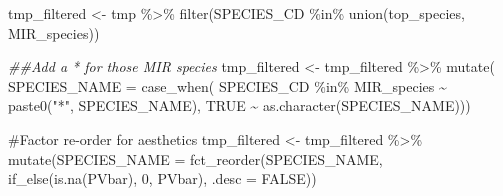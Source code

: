 \documentclass[
]{article}
\newenvironment{Shaded}{\begin{snugshade}}{\end{snugshade}}
\newcommand{\AttributeTok}[1]{\textcolor[rgb]{0.40,0.45,0.13}{#1}}
\newcommand{\CommentTok}[1]{\textcolor[rgb]{0.37,0.37,0.37}{#1}}
\newcommand{\ConstantTok}[1]{\textcolor[rgb]{0.56,0.35,0.01}{#1}}
\newcommand{\DecValTok}[1]{\textcolor[rgb]{0.68,0.00,0.00}{#1}}
\newcommand{\DocumentationTok}[1]{\textcolor[rgb]{0.37,0.37,0.37}{\textit{#1}}}
\newcommand{\FunctionTok}[1]{\textcolor[rgb]{0.28,0.35,0.67}{#1}}
\newcommand{\NormalTok}[1]{\textcolor[rgb]{0.00,0.23,0.31}{#1}}
\newcommand{\OtherTok}[1]{\textcolor[rgb]{0.00,0.23,0.31}{#1}}
\newcommand{\SpecialCharTok}[1]{\textcolor[rgb]{0.37,0.37,0.37}{#1}}
\newcommand{\StringTok}[1]{\textcolor[rgb]{0.13,0.47,0.30}{#1}}
\begin{document}
\begin{Shaded}
\begin{Highlighting}[]
\NormalTok{tmp\_filtered }\OtherTok{\textless{}{-}}\NormalTok{ tmp }\SpecialCharTok{\%\textgreater{}\%}
  \FunctionTok{filter}\NormalTok{(SPECIES\_CD }\SpecialCharTok{\%in\%} \FunctionTok{union}\NormalTok{(top\_species, MIR\_species)) }
  
\DocumentationTok{\#\#Add a * for those MIR species}
\NormalTok{tmp\_filtered }\OtherTok{\textless{}{-}}\NormalTok{ tmp\_filtered }\SpecialCharTok{\%\textgreater{}\%} \FunctionTok{mutate}\NormalTok{(}
  \AttributeTok{SPECIES\_NAME =} \FunctionTok{case\_when}\NormalTok{(}
\NormalTok{    SPECIES\_CD }\SpecialCharTok{\%in\%}\NormalTok{ MIR\_species }\SpecialCharTok{\textasciitilde{}} \FunctionTok{paste0}\NormalTok{(}\StringTok{"*"}\NormalTok{, SPECIES\_NAME),}
    \ConstantTok{TRUE} \SpecialCharTok{\textasciitilde{}} \FunctionTok{as.character}\NormalTok{(SPECIES\_NAME)))}

\CommentTok{\#Factor re{-}order for aesthetics  }
\NormalTok{tmp\_filtered }\OtherTok{\textless{}{-}}\NormalTok{ tmp\_filtered }\SpecialCharTok{\%\textgreater{}\%}
  \FunctionTok{mutate}\NormalTok{(}\AttributeTok{SPECIES\_NAME =} 
           \FunctionTok{fct\_reorder}\NormalTok{(SPECIES\_NAME, }\FunctionTok{if\_else}\NormalTok{(}\FunctionTok{is.na}\NormalTok{(PVbar), }\DecValTok{0}\NormalTok{, PVbar), }\AttributeTok{.desc =} \ConstantTok{FALSE}\NormalTok{))}


\end{Highlighting}
\end{Shaded}
\end{document}
